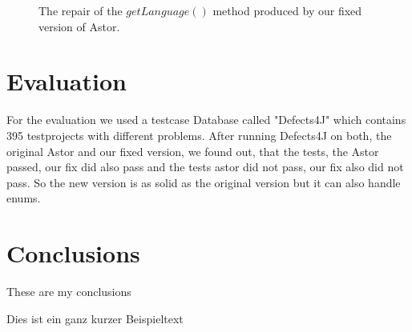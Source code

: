\documentclass[pdftex,english,oribibl]{llncs}
\begin{document}
\begin{figure}
\begin{center}

\end{center}
\caption{The repair of the $getLanguage()$ method produced by our fixed version of Astor.}
\label{fig:fixed}
\end{figure}

\section{Evaluation}\label{sec:evaluation}
For the evaluation we used a testcase Database called "Defects4J" which contains 395 testprojects with different problems. After running Defects4J on both, the original Astor and our fixed version, we found out, that the tests, the Astor passed, our fix did also pass and the tests astor did not pass, our fix also did not pass. So the new version is as solid as the original version but it can also handle enums.

\section{Conclusions}\label{sec:conclusions}

  These are my conclusions 

Dies ist ein ganz kurzer Beispieltext \cite{AspectJ2007}


\end{document}
